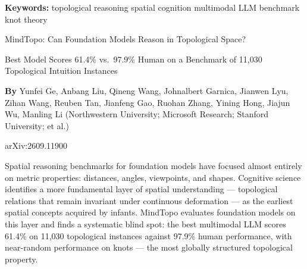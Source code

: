 \documentclass[10pt,twocolumn]{article}
\begin{document}
\setlength{\parindent}{0pt}
\setlength{\parskip}{4pt}

{\small\color{keywordgray}\textbf{Keywords:}
  topological reasoning \textbullet{}
  spatial cognition \textbullet{}
  multimodal LLM \textbullet{}
  benchmark \textbullet{}
  knot theory}\par\vspace{4pt}

{\LARGE\bfseries\raggedright
  MindTopo: Can Foundation Models
  Reason in Topological Space?}\par\vspace{4pt}

{\large\itshape\raggedright
  Best Model Scores 61.4\% vs.\ 97.9\% Human on a Benchmark
  of 11,030 Topological Intuition Instances}\par\vspace{6pt}

{\small\textbf{By} Yunfei Ge, Anbang Liu, Qineng Wang,
  Johnalbert Garnica, Jianwen Lyu, Zihan Wang, Reuben Tan,
  Jianfeng Gao, Ruohan Zhang, Yining Hong, Jiajun Wu, Manling Li
  (Northwestern University; Microsoft Research; Stanford University;
  et al.)}\par\vspace{2pt}

{\small\color{keywordgray}arXiv:2609.11900}
\par\vspace{2pt}\noindent{\color{rulered}\rule{\columnwidth}{0.6pt}}\vspace{6pt}

Spatial reasoning benchmarks for foundation models have focused almost
entirely on metric properties: distances, angles, viewpoints, and
shapes. Cognitive science identifies a more fundamental layer of
spatial understanding --- topological relations that remain invariant
under continuous deformation --- as the earliest spatial concepts
acquired by infants. MindTopo evaluates foundation models on this
layer and finds a systematic blind spot: the best multimodal LLM
scores 61.4\% on 11,030 topological instances against 97.9\% human
performance, with near-random performance on knots --- the most globally
structured topological property.
\end{document}
